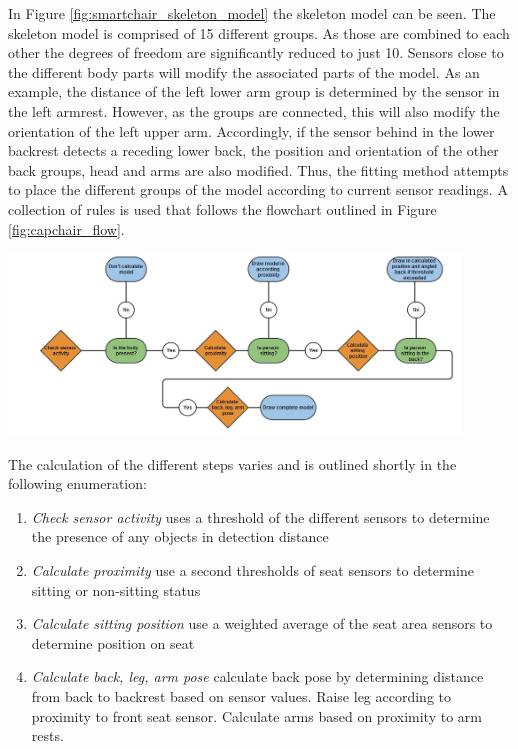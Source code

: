 In Figure \ref{fig:smartchair_skeleton_model} the skeleton model can be seen. The skeleton model is comprised of 15 different groups. As those are combined to each other the degrees of freedom are significantly reduced to just 10. Sensors close to the different body parts will modify the associated parts of the model. As an example, the distance of the left lower arm group is determined by the sensor in the left armrest. However, as the groups are connected, this will also modify the orientation of the left upper arm. Accordingly, if the sensor behind in the lower backrest detects a receding lower back, the position and orientation of the other back groups, head and arms are also modified. Thus, the fitting method attempts to place the different groups of the model according to current sensor readings. A collection of rules is used that follows the flowchart outlined in Figure \ref{fig:capchair_flow}.

\begin{minipage}{\linewidth}
\centering
\includegraphics[width=0.9\textwidth]{images/capchair_flow}
\label{fig:capchair_flow}
\end{minipage}

The calculation of the different steps varies and is outlined shortly in the following enumeration:
\begin{enumerate}
\item \emph{Check sensor activity} uses a threshold of the different sensors to determine the presence of any objects in detection distance
\item \emph{Calculate proximity} use a second thresholds of seat sensors to determine sitting or non-sitting status
\item \emph{Calculate sitting position} use a weighted average of the seat area sensors to determine position on seat
\item \emph{Calculate back, leg, arm pose} calculate back pose by determining distance from back to backrest based on sensor values. Raise leg according to proximity to front seat sensor. Calculate arms based on proximity to arm rests.
\end{enumerate}

